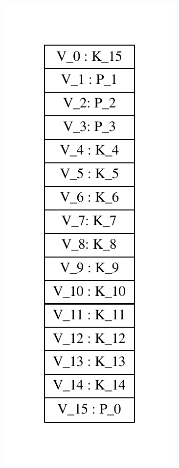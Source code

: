 \documentclass[]{book}
\begin{document}
\includegraphics{graphviz-images/d0b0d4aa89a691fbd2ceed7a05160c25c93500f4.pdf}
\end{document}
